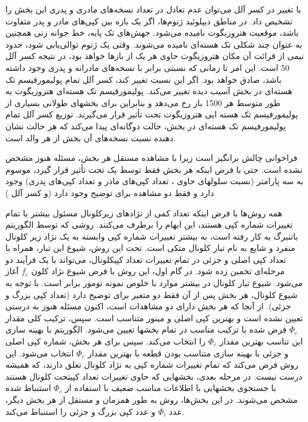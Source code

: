با تغییر در کسر آلل می‌توان عدم تعادل در تعداد نسخه‌های مادری و پدری این بخش را تشخیص داد. در مناطق دیپلوئید ژنوم‌ها، اگر یک بازه بین کپی‌های مادر و پدر متفاوت باشد، موقعیت هتروزیگوت نامیده می‌شود. جهش‌های تک پایه، خط جوانه زنی همچنین به عنوان چند شکلی تک هسته‌ای نامیده می‌شوند. وقتی یک ژنوم توالی‌یابی شود، حدود نیمی از قرائت آن مکان هتروزیگوت حاوی هر یک از بازها خواهد بود، در نتیجه کسر آلل 50 است. این امر تا زمانی که نسبتی برابر با نسخه‌های مادرانه و پدری وجود داشته باشد، صادق خواهد بود. اگر این نسبت تغییر کند، کسر آلل  تمام پولیمورفیسم تک هسته‌ای در بخش آسیب دیده تغییر می‌کند. پولیمورفیسم تک هسته‌ای هتروزیگوت به طور متوسط هر 1500 باز \cite{chen2012personal} رخ می‌دهد و بنابراین برای بخشهای طولانی بسیاری از پولیمورفیسم تک هسته ایی هتروزیگوت تحت تأثیر قرار می‌گیرند. توزیع کسر آلل  تمام پولیمورفیسم تک هسته‌ای در بخش، حالت دوگانه‌ای پیدا می‌کند که هر حالت نشان دهنده نسبت نسخه‌های آن بخش از هر والد است.

فراخوانی  چالش برانگیز است زیرا با مشاهده مستقل هر بخش، مسئله هنوز مشخص نشده است. حتی با فرض اینکه هر بخش فقط توسط یک  تحت تأثیر قرار گیرد،  موسوم به سه پارامتر (نسبت سلولهای حاوی ، تعداد کپی‌های مادر و تعداد کپی‌های پدری) وجود دارد و فقط دو مشاهده برای توضیح وجود دارد (و کسر آلل )

همه روش‌ها با فرض اینکه تعداد کمی از نژادهای زیرکلونال مسئول بیشتر یا تمام تغییرات شماره کپی هستند، این ابهام را برطرف می‌کنند. روشی که توسط الگوریتم باتنبرگ \cite{nik2012life} به کار رفته است، به بیشتر تغییرات شماره کپی وابسته به یک نژاد زیر کلونال منفرد و شایع به نام تبار کلونال متکی است. تحت این روش، شیوع این تبار، همراه با تعداد کپی اصلی و جزئی در تمام تغییرات تعداد کپیکلونال، می‌تواند با یک فرآیند دو مرحله‌ای تخمین زده شود. در گام اول، این روش با فرض شیوع نژاد کلون $f_c$  آغاز می‌شود. شیوع تبار کلونال در بیشتر موارد با خلوص نمونه تومور برابر است. با توجه به شیوع کلونال، هر بخش پس از آن فقط دو متغیر برای توضیح دارد (تعداد کپی بزرگ و جزئی). از آنجا که هر بخش دارای دو مشاهدات است، اکنون مسئله هنوز به درستی تعیین نشده است و بهترین کپی اصلی و مینور متناسب است. سپس، ترکیب کلی مقدار $\Phi_c$  فرض شده با ترکیب مناسب در تمام بخشها تعیین می‌شود. الگوریتم با بهینه سازی این تناسب بهترین مقدار $\Phi_c$  را انتخاب می‌کند. سپس برای هر بخش، شماره کپی اصلی و جزئی با بهینه سازی متناسب بودن قطعه با بهترین مقدار $\Phi_c$   انتخاب می‌شود. این روش فرض می‌کند که تمام تغییرات شماره کپی به نژاد کلونال تعلق دارند، که همیشه درست نیست. در مرحله بعدی، بخشهایی که حاوی تغییرات تعداد کپیتحت کلونال هستند با جستجوی بخشهایی با اطلاعات مناسب ضعیف با استفاده از $\Phi_c$   استنباط شده مشخص می‌شوند. در این بخش‌ها، روش به طور همزمان و مستقل از هر بخش دیگر، عدد $\Phi_i$   و عدد کپی بزرگ و جزئی را استنباط می‌کند.


